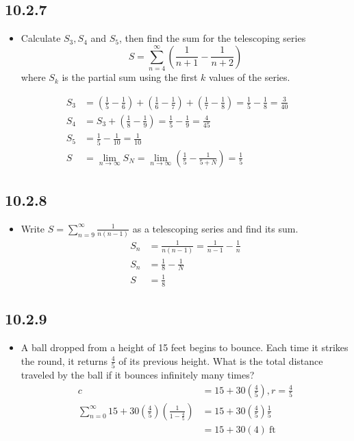 \begin{itemize}
  \newpage
  \subsection{ 10.2.7}
  \begin{itemize}
    \item Calculate \(S_3, S_4\) and \(S_5\), then find the sum for the
      telescoping series
      \[%
        S = \sum_{n=4}^{\infty} \left( \frac{1}{n+1} - \frac{1}{n+2} \right)
      \]%
      where \(S_k\) is the partial sum using the first \(k\) values of the
      series.
  \end{itemize}
  \begin{align*}
    S_3 &= \left(\frac{1}{5} - \frac{1}{6}\right) + \left( \frac{1}{6} - \frac{1}{7} \right) + \left( \frac{1}{7} - \frac{1}{8} \right)
    = \frac{1}{5}-\frac{1}{8} = \frac{3}{40} \\
    S_4 &= S_3 + \left(\frac{1}{8} - \frac{1}{9}\right) = \frac{1}{5} - \frac{1}{9} = \frac{4}{45} \\
    S_5 &= \frac{1}{5} - \frac{1}{10} = \frac{1}{10} \\
    S &= \lim_{n \to \infty} S_N = \lim_{n \to \infty} \left(\frac{1}{5} - \frac{1}{5+N} \right) = \frac{1}{5}
  \end{align*}

  \subsection{ 10.2.8}
  \begin{itemize}
    \item Write \(S = \sum_{n=9}^{\infty} \frac{1}{n(n-1)}\) as a telescoping
      series and find its sum.
      \begin{align*}
        S_n &= \frac{1}{n(n-1)} = \frac{1}{n-1} - \frac{1}{n}\\
        S_n &= \frac{1}{8}-\frac{1}{N} \\
        S &= \frac{1}{8}
      \end{align*}
  \end{itemize}

  \subsection{ 10.2.9}
  \begin{itemize}
    \item A ball dropped from a height of 15 feet begins to bounce. Each time
      it strikes the round, it returns \(\frac{4}{5}\) of its previous height.
      What is the total distance traveled by the ball if it bounces infinitely
      many times?
      \begin{align*}
        c &= 15 + 30\left(\frac{4}{5}\right), r = \frac{4}{5} \\
        \sum_{n=0}^{\infty} 15 + 30 \left( \frac{4}{5} \right)
        \left(\frac{1}{1-\frac{4}{5}}\right) &= 15+30\left(\frac{4}{5}\right)\frac{1}{5} \\
        &=15+30(4) ~\text{ft}~
      \end{align*}
  \end{itemize}
\end{itemize}

